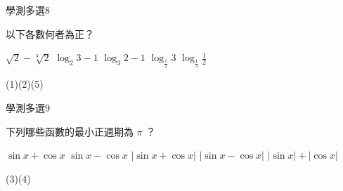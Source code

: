     \begin{QUESTION}
        \begin{ExamInfo}{92}{學測}{多選}{8}
        \end{ExamInfo}
        \begin{ExamAnsRateInfo}{55}{86}{60}{19}
        \end{ExamAnsRateInfo}
        \begin{QBODY}
            以下各數何者為正？ 
            \begin{QOPS} 
                \QOP $\sqrt{2} - \sqrt[3]{2}$ 
                \QOP $\log_{2} 3-1$ 
                \QOP $\log_{3}2 -1$ 
                \QOP $\log_{\frac{1}{2}} 3$ 
                \QOP $\log_{\frac{1}{3}} \frac{1}{2}$ 
            \end{QOPS}
        \end{QBODY}
        \begin{QFROMS}
        \end{QFROMS}
        \begin{QTAGS}\end{QTAGS}
        \begin{QANS}
            (1)(2)(5)
        \end{QANS}
        \begin{QSOLLIST}
        \end{QSOLLIST}
        \begin{QEMPTYSPACE}
        \end{QEMPTYSPACE}
    \end{QUESTION}
    \begin{QUESTION}
        \begin{ExamInfo}{92}{學測}{多選}{9}
        \end{ExamInfo}
        \begin{ExamAnsRateInfo}{24}{42}{19}{11}
        \end{ExamAnsRateInfo}
        \begin{QBODY}
            下列哪些函數的最小正週期為 $\pi$ ？ 
            \begin{QOPS} 
                \QOP $\sin x + \cos x$ 
                \QOP $\sin x - \cos x$ 
                \QOP $|\sin x + \cos x|$
                \QOP $|\sin x - \cos x|$ 
                \QOP $|\sin x| + |\cos x|$
            \end{QOPS}
        \end{QBODY}
        \begin{QFROMS}
        \end{QFROMS}
        \begin{QTAGS}\end{QTAGS}
        \begin{QANS}
            (3)(4)
        \end{QANS}
        \begin{QSOLLIST}
        \end{QSOLLIST}
        \begin{QEMPTYSPACE}
        \end{QEMPTYSPACE}
    \end{QUESTION}

